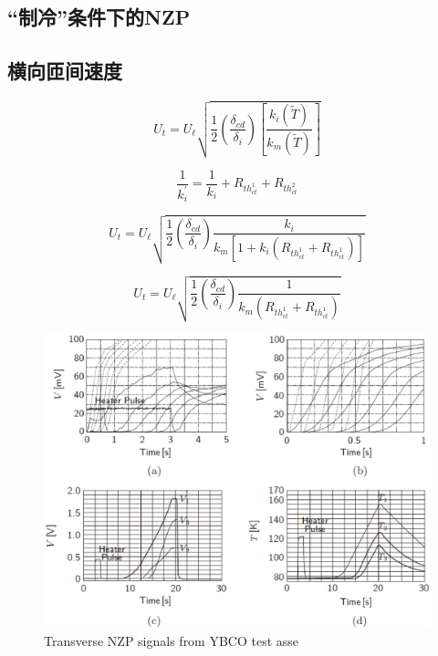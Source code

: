 \subsection{“制冷”条件下的NZP}


\subsection{横向匝间速度}



\begin{equation}%
U_t=U_\ell\sqrt{\frac{1}{2}\left(\frac{\delta_{cd}}{\delta_i}\right)\left[\frac{k_i(\tilde{T})}{k_m(\tilde{T})}\right]}
\end{equation}


\begin{equation}%
\frac{1}{k_{i}^{\prime}}=\frac{1}{k_i}+R_{th_{ct}^{1}}+R_{th_{ct}^{2}}
\end{equation}



\begin{equation}%
U_t=U_\ell\sqrt{\frac{1}{2}\left(\frac{\delta_{cd}}{\delta_i}\right)\frac{k_i}{k_m[1+k_i(R_{th_{ct}^{1}}+R_{th_{ct}^{1}})]}}
\end{equation}



\begin{equation}%
U_t=U_\ell\sqrt{\frac{1}{2}\left(\frac{\delta_{cd}}{\delta_i}\right)\frac{1}{k_m(R_{th_{ct}^{1}}+R_{th_{ct}^{1}})}}
\end{equation}

\begin{figure}
	\centering
	\includegraphics[scale=0.6]{chpt8/figs/fig8.11.eps}
	\caption{Transverse NZP signals from YBCO test asse}
\end{figure}




